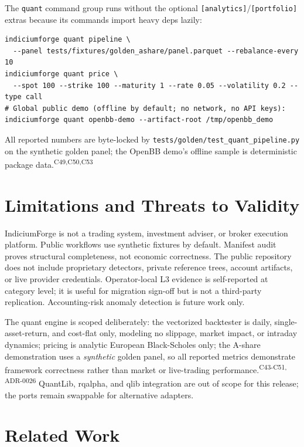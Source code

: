 \documentclass[11pt]{article}
\newcommand{\claim}[1]{\textsuperscript{\textsf{#1}}}
\begin{document}
The \texttt{quant} command group runs without the optional \texttt{[analytics]}/\texttt{[portfolio]}
extras because its commands import heavy deps lazily:
\begin{verbatim}
indiciumforge quant pipeline \
  --panel tests/fixtures/golden_ashare/panel.parquet --rebalance-every 10
indiciumforge quant price \
  --spot 100 --strike 100 --maturity 1 --rate 0.05 --volatility 0.2 --type call
# Global public demo (offline by default; no network, no API keys):
indiciumforge quant openbb-demo --artifact-root /tmp/openbb_demo
\end{verbatim}
All reported numbers are byte-locked by \texttt{tests/golden/test\_quant\_pipeline.py} on the
synthetic golden panel; the OpenBB demo's offline sample is deterministic package data.\claim{C49,C50,C53}

\section{Limitations and Threats to Validity}

IndiciumForge is not a trading system, investment adviser, or broker execution platform. Public
workflows use synthetic fixtures by default. Manifest audit proves structural completeness, not
economic correctness. The public repository does not include proprietary detectors, private
reference trees, account artifacts, or live provider credentials. Operator-local L3 evidence is
self-reported at category level; it is useful for migration sign-off but is not a third-party
replication. Accounting-risk anomaly detection is future work only.

The quant engine is scoped deliberately: the vectorized backtester is daily,
single-asset-return, and cost-flat only, modeling no slippage, market impact, or intraday
dynamics; pricing is analytic European Black-Scholes only; the A-share demonstration uses a
\emph{synthetic} golden panel, so all reported metrics demonstrate framework correctness
rather than market or live-trading performance.\claim{C43-C51, ADR-0026} QuantLib, rqalpha,
and qlib integration are out of scope for this release; the ports remain swappable for alternative
adapters.

\section{Related Work}
\end{document}
